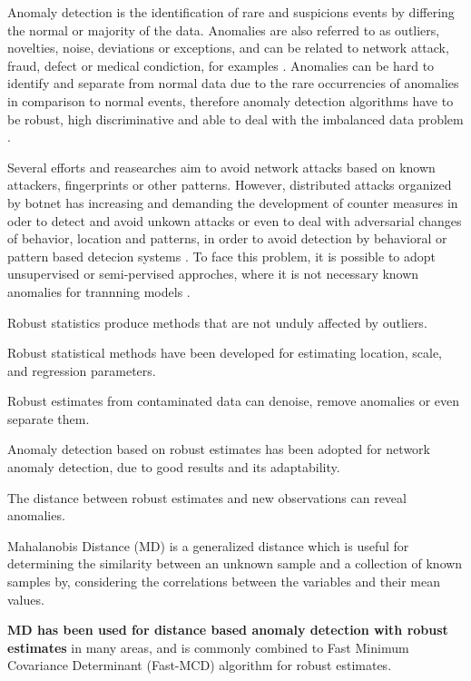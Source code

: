 \documentclass[review]{elsarticle}
\begin{document}
Anomaly detection is the identification of rare and suspicions events by differing the normal or majority of the data. Anomalies are also referred to as outliers, novelties, noise, deviations or exceptions, and  can be related to network attack, fraud, defect or medical condiction, for examples \cite{bhuyan2014network,ahmed2016survey}. Anomalies can be hard to identify and separate from normal data due to the rare occurrencies of anomalies in comparison to normal events, therefore anomaly detection algorithms have to be robust, high discriminative and able to deal with the imbalanced data problem \cite{he2008learning}.

Several efforts and reasearches aim to avoid network attacks based on known attackers, fingerprints or other patterns. However, distributed attacks organized by botnet has increasing and demanding the development of counter measures in oder to detect and avoid unkown attacks or even to deal with adversarial changes of behavior, location and patterns, in order to avoid detection by behavioral or pattern based detecion systems \cite{gu2008botminer, garcia2014empirical,khattak2015botflex,acarali2016survey,wang2017botnet,Wang2018ddosbotnetssurvey}. To face this problem, it is possible to adopt unsupervised or semi-pervised approches, where it is not necessary known anomalies for trannning models \cite{moustafa2019holistic}.



Robust statistics produce methods that are not unduly affected by outliers.

Robust statistical methods have been developed for estimating location, scale, and regression parameters.

Robust estimates from contaminated data can denoise, remove anomalies or even separate them.

Anomaly detection based on robust estimates has been adopted for network anomaly detection, due to good results and its adaptability.

The distance between robust estimates and new observations can reveal anomalies.

Mahalanobis Distance (MD) is a generalized distance which is useful for determining the similarity between an unknown sample and a collection of known samples by, considering the correlations between the variables and their mean values.

\textbf{MD has been used for distance based anomaly detection with robust estimates} in many areas, and is commonly combined to Fast Minimum Covariance Determinant (Fast-MCD) algorithm \cite{rousseeuw1999fastmcd} for robust estimates.
\end{document}
